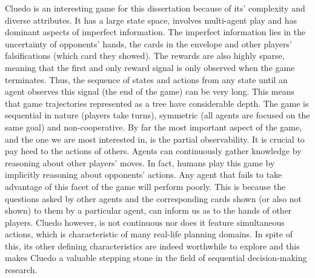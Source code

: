\documentclass[msc, ai, twoside, notimes, logo, parskip, leftchapter, normalheadings]{infthesis}
\begin{document}
Cluedo is an interesting game for this dissertation because of its' complexity and diverse attributes. It has a large state space, involves multi-agent play and has dominant aspects of imperfect information. The imperfect information lies in the uncertainty of opponents' hands, the cards in the envelope and other players' falsifications (which card they showed). The rewards are also highly sparse, meaning that the first and only reward signal is only observed when the game terminates. Thus, the sequence of states and actions from any state until an agent observes this signal (the end of the game) can be very long. This means that game trajectories represented as a tree have considerable depth. The game is sequential in nature (players take turns), symmetric (all agents are focused on the same goal) and non-cooperative. By far the most important aspect of the game, and the one we are most interested in, is the partial observability. It is crucial to pay heed to the actions of others. Agents can continuously gather knowledge by reasoning about other players' moves. In fact, humans play this game by implicitly reasoning about opponents' actions. Any agent that fails to take advantage of this facet of the game will perform poorly. This is because the questions asked by other agents and the corresponding cards shown (or also not shown) to them by a particular agent, can inform us as to the hands of other players. Cluedo however, is not continuous nor does it feature simultaneous actions, which is characteristic of many real-life planning domains. In spite of this, its other defining characteristics are indeed worthwhile to explore and this makes Cluedo a valuable stepping stone in the field of sequential decision-making research.
\end{document}
